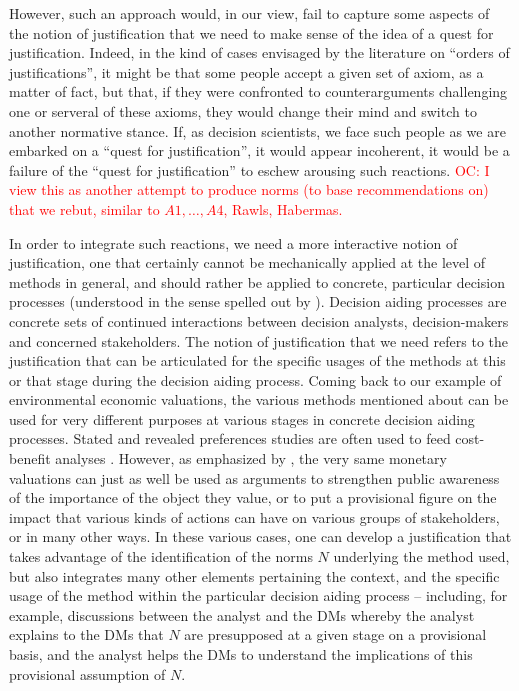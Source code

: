 \documentclass[preprint, french, english, 11pt, authoryear]{elsarticle}%
\newcommand{\commentOC}[1]{\textcolor{red}{OC: #1}}
\begin{document}
However, such an approach would, in our view, fail to capture some aspects of the notion of justification that we need to make sense of the idea of a quest for justification. Indeed, in the kind of cases envisaged by the literature on ``orders of justifications'', it might be that some people accept a given set of axiom, as a matter of fact, but that, if they were confronted to counterarguments challenging one or serveral of these axioms, they would change their mind and switch to another normative stance. If, as decision scientists, we face such people as we are embarked on a ``quest for justification'', it would appear incoherent, it would be a failure of the ``quest for justification'' to eschew arousing such reactions. 
\commentOC{I view this as another attempt to produce norms (to base recommendations on) that we rebut, similar to $A1, …, A4$, Rawls, Habermas.}

In order to integrate such reactions, we need a more interactive notion of justification, one that certainly cannot be mechanically applied at the level of methods in general, and should rather be applied to concrete, particular decision processes (understood in the sense spelled out by \citet{tsoukias_concept_2007}). Decision aiding processes are concrete sets of continued interactions between decision analysts, decision-makers and concerned stakeholders. The notion of justification that we need refers to the justification that can be articulated for the specific usages of the methods at this or that stage during the decision aiding process. Coming back to our example of environmental economic valuations, the various methods mentioned about can be used for very different purposes at various stages in concrete decision aiding processes. Stated and revealed preferences studies are often used to feed cost-benefit analyses \citep{layard_cost-benefit_1994}. However, as emphasized by \citet{meinard_ethical_2016}, the very same monetary valuations can just as well be used as arguments to strengthen public awareness of the importance of the object they value, or to put a provisional figure on the impact that various kinds of actions can have on various groups of stakeholders, or in many other ways. In these various cases, one can develop a justification that takes advantage of the identification of the norms $N$ underlying the method used, but also integrates many other elements pertaining the context, and the specific usage of the method within the particular decision aiding process -- including, for example, discussions between the analyst and the \acp{DM} whereby the analyst explains to the \acp{DM} that $N$ are presupposed at a given stage on a provisional basis, and the analyst helps the \acp{DM} to understand the implications of this provisional assumption of $N$.
\end{document}
